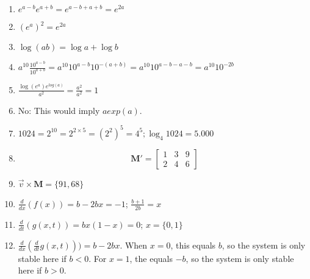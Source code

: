 \documentclass[12pt]{article}
\begin{document}
\begin{enumerate}
\item{} $e^{a-b}e^{a+b} = e^{a-b+a+b} = e^{2a}$
\item{} $(e^{a})^{2} = e^{2a}$
\item{} $\log(ab) = \log{a} + \log{b}$
\item{} $a^{10}\frac{10^{a-b}}{10^{a+b}} = a^{10}10^{a-b}10^{-(a+b)} =a^{10}10^{a-b-a-b} = a^{10}10^{-2b}$
\item{} $\frac{\log(e^{a})e^{log(a)}}{a^{2}} = \frac{a^{2}}{a^{2}} = 1$
\item{} No: This would imply $a exp(a)$.
\item{} $1024 = 2^{10} = 2^{2\times5} = (2^{2})^{5} = 4^{5}; \log_{4}1024 = 5.000$
\item{}
\begin{equation}
\textbf{M}' =
\begin{bmatrix}
1 & 3 & 9\\
2 & 4 & 6
\end{bmatrix}
\end{equation}
\item{} $\overrightarrow{v}\times\textbf{M} = \{91, 68\}$
\item{} $\frac{d}{dx}(f(x)) = b - 2bx = -1$; $\frac{b+1}{2b} = x$
\item{} $\frac{d}{dt}(g(x,t)) = bx(1-x) = 0$; $x = \{0, 1\}$
\item{} $\frac{d}{dx}(\frac{d}{dt}g(x,t))) = b - 2bx$. When $x=0$, this equals $b$, so the system is only stable here if $b<0$. For $x=1$, the equals $-b$, so the system is only stable here if $b>0$.
\end{enumerate}
\end{document}
